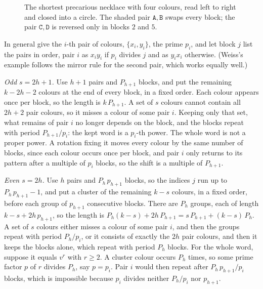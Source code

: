 \documentclass[11pt,a4paper]{article}
\theoremstyle{remark}
\begin{document}
\begin{figure}[ht]
\centering
{}
\caption{The shortest precarious necklace with four colours, read left to
right and closed into a circle. The shaded pair $\mathtt{A},\mathtt{B}$
swaps every block; the pair $\mathtt{C},\mathtt{D}$ is reversed only in
blocks $2$ and $5$.}\label{fig:blocks}
\end{figure}

In general give the $i$-th pair of colours, $\{x_i,y_i\}$, the prime
$p_i$, and let block $j$ list the pairs in order, pair $i$ as $x_iy_i$ if
$p_i$ divides $j$ and as $y_ix_i$ otherwise. (Weiss's example follows the
mirror rule for the second pair, which works equally well.)

\emph{Odd $s=2h+1$.} Use $h+1$ pairs and $P_{h+1}$ blocks, and put the
remaining $k-2h-2$ colours at the end of every block, in a fixed order.
Each colour appears once per block, so the length is $k\,P_{h+1}$. A set
of $s$ colours cannot contain all $2h+2$ pair colours, so it misses a
colour of some pair $i$. Keeping only that set, what remains of pair $i$
no longer depends on the block, and the blocks repeat with period
$P_{h+1}/p_i$: the kept word is a $p_i$-th power. The whole word is not a
proper power. A rotation fixing it moves every colour by the same number
of blocks, since each colour occurs once per block, and pair $i$ only
returns to its pattern after a multiple of $p_i$ blocks, so the shift is
a multiple of $P_{h+1}$.

\emph{Even $s=2h$.} Use $h$ pairs and $P_h\,p_{h+1}$ blocks, so the
indices $j$ run up to $P_h\,p_{h+1}-1$, and put a cluster of the
remaining $k-s$ colours, in a fixed order, before each group of
$p_{h+1}$ consecutive blocks. There are $P_h$ groups, each of length
$k-s+2h\,p_{h+1}$, so the length is
$P_h(k-s)+2h\,P_{h+1}=s\,P_{h+1}+(k-s)\,P_h$. A set of $s$ colours either
misses a colour of some pair $i$, and then the groups repeat with period
$P_h/p_i$, or it consists of exactly the $2h$ pair colours, and then it
keeps the blocks alone, which repeat with period $P_h$ blocks. For the
whole word, suppose it equals $v^r$ with $r\ge2$. A cluster colour occurs
$P_h$ times, so some prime factor $p$ of $r$ divides $P_h$, say $p=p_i$.
Pair $i$ would then repeat after $P_h\,p_{h+1}/p_i$ blocks, which is
impossible because $p_i$ divides neither $P_h/p_i$ nor $p_{h+1}$.
\end{document}
